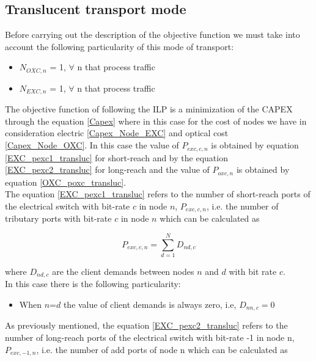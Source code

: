 \clearpage

\subsection{Translucent transport mode}\label{ILP_Transluc_Mode}

Before carrying out the description of the objective function we must take into account the following particularity of this mode of transport:
\begin{itemize}
  \item $N_{OXC,n}$ = 1, \quad $\forall$ n that process traffic
  \item $N_{EXC,n}$ = 1, \quad $\forall$ n that process traffic
\end{itemize}

The objective function of following the ILP is a minimization of the CAPEX through the equation \ref{Capex} where in this case for the cost of nodes we have in consideration electric \ref{Capex_Node_EXC} and optical cost \ref{Capex_Node_OXC}. In this case the value of $P_{exc,c,n}$ is obtained by equation \ref{EXC_pexc1_transluc} for short-reach and by the equation \ref{EXC_pexc2_transluc} for long-reach and the value of $P_{oxc,n}$ is obtained by equation \ref{OXC_poxc_transluc}.\\

The equation \ref{EXC_pexc1_transluc} refers to the number of short-reach ports of the electrical switch with bit-rate $c$ in node $n$, $P_{exc,c,n}$, i.e. the number of tributary ports with bit-rate $c$ in node $n$ which can be calculated as

\begin{equation}
P_{exc,c,n} = \sum_{d=1}^{N} D_{nd,c}
\label{EXC_pexc1_transluc}
\end{equation}

\noindent
where $D_{nd,c}$ are the client demands between nodes $n$ and $d$ with bit rate $c$.\\

In this case there is the following particularity:
\begin{itemize}
  \item When $n$=$d$ the value of client demands is always zero, i.e, $D_{nn,c}=0$
\end{itemize}

As previously mentioned, the equation \ref{EXC_pexc2_transluc} refers to the number of long-reach ports of the electrical switch with bit-rate -1 in node n, $P_{exc,-1,n}$, i.e. the number of add ports of node n which can be calculated as

